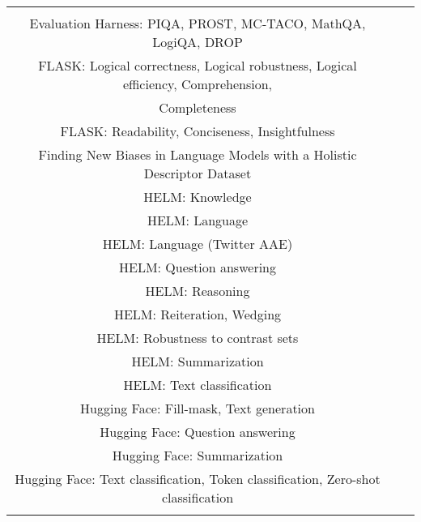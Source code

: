 \documentclass[fleqn]{article}
\begin{document}
\begin{table}[H]
\begin{tabular}{|c|c|c|}
{			\textbullet\hspace{3pt} Evaluation Harness: MuTual \\ 
			\textbullet\hspace{3pt} Evaluation Harness: PIQA, PROST, MC-TACO, MathQA, LogiQA, DROP \\ 
			\textbullet\hspace{3pt} FLASK: Logical correctness, Logical robustness, Logical efficiency, Comprehension, \\\hspace{10pt}Completeness \\ 
			\textbullet\hspace{3pt} FLASK: Readability, Conciseness, Insightfulness \\ 
			\textbullet\hspace{3pt} Finding New Biases in Language Models with a Holistic Descriptor Dataset \\ 
			\textbullet\hspace{3pt} HELM: Knowledge \\ 
			\textbullet\hspace{3pt} HELM: Language \\ 
			\textbullet\hspace{3pt} HELM: Language (Twitter AAE) \\ 
			\textbullet\hspace{3pt} HELM: Question answering \\ 
			\textbullet\hspace{3pt} HELM: Reasoning \\ 
			\textbullet\hspace{3pt} HELM: Reiteration, Wedging \\ 
			\textbullet\hspace{3pt} HELM: Robustness to contrast sets \\ 
			\textbullet\hspace{3pt} HELM: Summarization \\ 
			\textbullet\hspace{3pt} HELM: Text classification \\ 
			\textbullet\hspace{3pt} Hugging Face: Fill-mask, Text generation \\ 
			\textbullet\hspace{3pt} Hugging Face: Question answering \\ 
			\textbullet\hspace{3pt} Hugging Face: Summarization \\ 
			\textbullet\hspace{3pt} Hugging Face: Text classification, Token classification, Zero-shot classification \\ 
}
\end{tabular}
\end{table}
\end{document}
